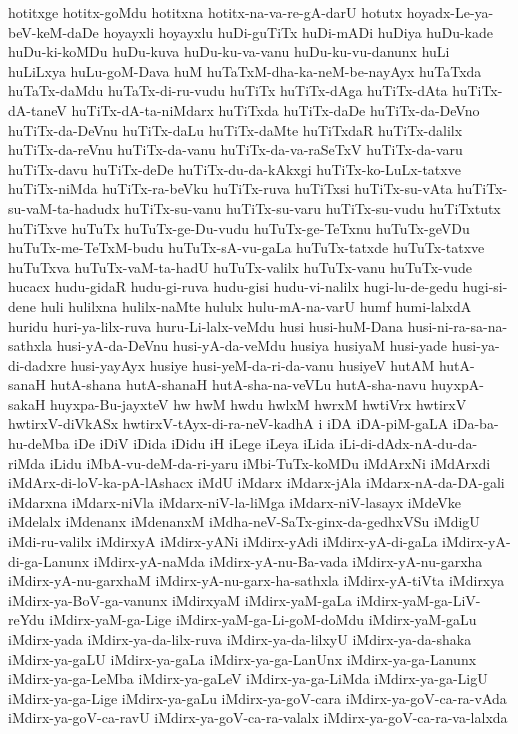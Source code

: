 {hotitxge
hotitx-goMdu
hotitxna
hotitx-na-va-re-gA-darU
hotutx
hoyadx-Le-ya-beV-keM-daDe
hoyayxli
hoyayxlu
huDi-guTiTx
huDi-mADi
huDiya
huDu-kade
huDu-ki-koMDu
huDu-kuva
huDu-ku-va-vanu
huDu-ku-vu-danunx
huLi
huLiLxya
huLu-goM-Dava
huM
huTaTxM-dha-ka-neM-be-nayAyx
huTaTxda
huTaTx-daMdu
huTaTx-di-ru-vudu
huTiTx
huTiTx-dAga
huTiTx-dAta
huTiTx-dA-taneV
huTiTx-dA-ta-niMdarx
huTiTxda
huTiTx-daDe
huTiTx-da-DeVno
huTiTx-da-DeVnu
huTiTx-daLu
huTiTx-daMte
huTiTxdaR
huTiTx-dalilx
huTiTx-da-reVnu
huTiTx-da-vanu
huTiTx-da-va-raSeTxV
huTiTx-da-varu
huTiTx-davu
huTiTx-deDe
huTiTx-du-da-kAkxgi
huTiTx-ko-LuLx-tatxve
huTiTx-niMda
huTiTx-ra-beVku
huTiTx-ruva
huTiTxsi
huTiTx-su-vAta
huTiTx-su-vaM-ta-hadudx
huTiTx-su-vanu
huTiTx-su-varu
huTiTx-su-vudu
huTiTxtutx
huTiTxve
huTuTx
huTuTx-ge-Du-vudu
huTuTx-ge-TeTxnu
huTuTx-geVDu
huTuTx-me-TeTxM-budu
huTuTx-sA-vu-gaLa
huTuTx-tatxde
huTuTx-tatxve
huTuTxva
huTuTx-vaM-ta-hadU
huTuTx-valilx
huTuTx-vanu
huTuTx-vude
hucacx
hudu-gidaR
hudu-gi-ruva
hudu-gisi
hudu-vi-nalilx
hugi-lu-de-gedu
hugi-si-dene
huli
hulilxna
hulilx-naMte
hululx
hulu-mA-na-varU
humf
humi-lalxdA
huridu
huri-ya-lilx-ruva
huru-Li-lalx-veMdu
husi
husi-huM-Dana
husi-ni-ra-sa-na-sathxla
husi-yA-da-DeVnu
husi-yA-da-veMdu
husiya
husiyaM
husi-yade
husi-ya-di-dadxre
husi-yayAyx
husiye
husi-yeM-da-ri-da-vanu
husiyeV
hutAM
hutA-sanaH
hutA-shana
hutA-shanaH
hutA-sha-na-veVLu
hutA-sha-navu
huyxpA-sakaH
huyxpa-Bu-jayxteV
hw
hwM
hwdu
hwlxM
hwrxM
hwtiVrx
hwtirxV
hwtirxV-diVkASx
hwtirxV-tAyx-di-ra-neV-kadhA
i
iDA
iDA-piM-gaLA
iDa-ba-hu-deMba
iDe
iDiV
iDida
iDidu
iH
iLege
iLeya
iLida
iLi-di-dAdx-nA-du-da-riMda
iLidu
iMbA-vu-deM-da-ri-yaru
iMbi-TuTx-koMDu
iMdArxNi
iMdArxdi
iMdArx-di-loV-ka-pA-lAshacx
iMdU
iMdarx
iMdarx-jAla
iMdarx-nA-da-DA-gali
iMdarxna
iMdarx-niVla
iMdarx-niV-la-liMga
iMdarx-niV-lasayx
iMdeVke
iMdelalx
iMdenanx
iMdenanxM
iMdha-neV-SaTx-ginx-da-gedhxVSu
iMdigU
iMdi-ru-valilx
iMdirxyA
iMdirx-yANi
iMdirx-yAdi
iMdirx-yA-di-gaLa
iMdirx-yA-di-ga-Lanunx
iMdirx-yA-naMda
iMdirx-yA-nu-Ba-vada
iMdirx-yA-nu-garxha
iMdirx-yA-nu-garxhaM
iMdirx-yA-nu-garx-ha-sathxla
iMdirx-yA-tiVta
iMdirxya
iMdirx-ya-BoV-ga-vanunx
iMdirxyaM
iMdirx-yaM-gaLa
iMdirx-yaM-ga-LiV-reYdu
iMdirx-yaM-ga-Lige
iMdirx-yaM-ga-Li-goM-doMdu
iMdirx-yaM-gaLu
iMdirx-yada
iMdirx-ya-da-lilx-ruva
iMdirx-ya-da-lilxyU
iMdirx-ya-da-shaka
iMdirx-ya-gaLU
iMdirx-ya-gaLa
iMdirx-ya-ga-LanUnx
iMdirx-ya-ga-Lanunx
iMdirx-ya-ga-LeMba
iMdirx-ya-gaLeV
iMdirx-ya-ga-LiMda
iMdirx-ya-ga-LigU
iMdirx-ya-ga-Lige
iMdirx-ya-gaLu
iMdirx-ya-goV-cara
iMdirx-ya-goV-ca-ra-vAda
iMdirx-ya-goV-ca-ravU
iMdirx-ya-goV-ca-ra-valalx
iMdirx-ya-goV-ca-ra-va-lalxda
}
